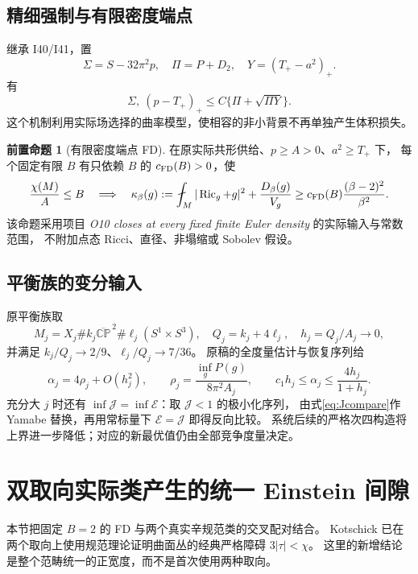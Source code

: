 \documentclass[UTF8,11pt,a4paper,fontset=none]{ctexart}
\numberwithin{equation}{section}
\theoremstyle{definition}
\newtheorem{assumption}[theorem]{前置命题}
\theoremstyle{remark}\newtheorem{remark}[theorem]{说明}
\newcommand{\Ric}{\operatorname{Ric}}
\newcommand{\CP}{\mathbb{CP}}
\newcommand{\Ecal}{\mathcal E}
\newcommand{\Jcal}{\mathcal J}
\newcommand{\avint}{\fint}
\begin{document}
\subsection{精细强制与有限密度端点}
继承 I40/I41\cite{N1,System}，置
\[
\Sigma=S-32\pi^2p,\quad \Pi=P+D_2,\quad Y=(T_+-a^2)_+.
\]
有
\begin{equation}\label{eq:I41}
\Sigma,\ (p-T_+)_+\le C\{\Pi+\sqrt{\Pi Y}\}.
\end{equation}
这个机制利用实际场选择的曲率模型，使相容的非小背景不再单独产生体积损失。

\begin{assumption}[有限密度端点 FD]\label{ass:FD}
在原实际共形供给、$p\ge A>0$、$a^2\ge T_+$ 下，
每个固定有限 $B$ 有只依赖 $B$ 的 $c_{\rm FD}(B)>0$，使
\begin{equation}\label{eq:FD}
\frac{\chi(M)}A\le B\quad\Longrightarrow\quad
\kappa_\beta(g):=\avint_M|\Ric_g+g|^2+\frac{D_\beta(g)}{V_g}
\ge c_{\rm FD}(B)\frac{(\beta-2)^2}{\beta^2}.
\end{equation}
该命题采用项目 \emph{O10 closes at every fixed finite Euler density} 的实际输入与常数范围\cite{FD}，
不附加点态 Ricci、直径、非塌缩或 Sobolev 假设。
\end{assumption}

\subsection{平衡族的变分输入}
原平衡族取
\[
M_j=X_j\#k_j\overline{\CP}^{\,2}\#\ell_j(S^1\times S^3),
\quad Q_j=k_j+4\ell_j,\quad h_j=Q_j/A_j\to0,
\]
并满足 $k_j/Q_j\to2/9$、$\ell_j/Q_j\to7/36$。
原稿的全度量估计与恢复序列给
\begin{equation}\label{eq:alpha-reduction}
\alpha_j=4\rho_j+O(h_j^2),\qquad
\rho_j=\frac{\inf_gP(g)}{8\pi^2A_j},\qquad
c_1h_j\le\alpha_j\le\frac{4h_j}{1+h_j}.
\end{equation}
充分大 $j$ 时还有 $\inf\Jcal=\inf\Ecal$：取 $\Jcal<1$ 的极小化序列，
由式\eqref{eq:Jcompare}作 Yamabe 替换，再用常标量下 $\Ecal=\Jcal$ 即得反向比较。
系统后续的严格次四构造将上界进一步降低；对应的新最优值仍由全部竞争度量决定\cite{System}。

\section{双取向实际类产生的统一 Einstein 间隙}\label{sec:two-orientation}

本节把固定 $B=2$ 的 FD 与两个真实辛规范类的交叉配对结合。
Kotschick 已在两个取向上使用规范理论证明曲面丛的经典严格障碍 $3|\tau|<\chi$\cite[Theorem 3]{Kotschick}。
这里的新增结论是整个范畴统一的正宽度，而不是首次使用两种取向。
\end{document}

